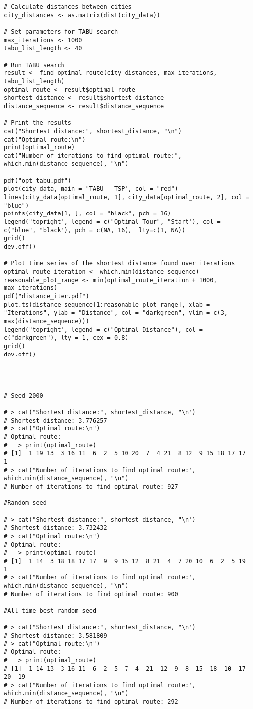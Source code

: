 \begin{tcolorbox}[colback=white!95!black,colframe=white!50!black,breakable]
\begin{lstlisting}[caption={Exercise 4b}, label={lst:tabu}]
# Calculate distances between cities
city_distances <- as.matrix(dist(city_data))

# Set parameters for TABU search
max_iterations <- 1000
tabu_list_length <- 40

# Run TABU search
result <- find_optimal_route(city_distances, max_iterations, tabu_list_length)
optimal_route <- result$optimal_route
shortest_distance <- result$shortest_distance
distance_sequence <- result$distance_sequence

# Print the results
cat("Shortest distance:", shortest_distance, "\n")
cat("Optimal route:\n")
print(optimal_route)
cat("Number of iterations to find optimal route:", which.min(distance_sequence), "\n")

pdf("opt_tabu.pdf")
plot(city_data, main = "TABU - TSP", col = "red")
lines(city_data[optimal_route, 1], city_data[optimal_route, 2], col = "blue")
points(city_data[1, ], col = "black", pch = 16)
legend("topright", legend = c("Optimal Tour", "Start"), col = c("blue", "black"), pch = c(NA, 16),  lty=c(1, NA))
grid()
dev.off()

# Plot time series of the shortest distance found over iterations
optimal_route_iteration <- which.min(distance_sequence)
reasonable_plot_range <- min(optimal_route_iteration + 1000, max_iterations)
pdf("distance_iter.pdf")
plot.ts(distance_sequence[1:reasonable_plot_range], xlab = "Iterations", ylab = "Distance", col = "darkgreen", ylim = c(3, max(distance_sequence)))
legend("topright", legend = c("Optimal Distance"), col = c("darkgreen"), lty = 1, cex = 0.8)
grid()
dev.off()




# Seed 2000

# > cat("Shortest distance:", shortest_distance, "\n")
# Shortest distance: 3.776257 
# > cat("Optimal route:\n")
# Optimal route:
#   > print(optimal_route)
# [1]  1 19 13  3 16 11  6  2  5 10 20  7  4 21  8 12  9 15 18 17 17  1
# > cat("Number of iterations to find optimal route:", which.min(distance_sequence), "\n")
# Number of iterations to find optimal route: 927 

#Random seed

# > cat("Shortest distance:", shortest_distance, "\n")
# Shortest distance: 3.732432 
# > cat("Optimal route:\n")
# Optimal route:
#   > print(optimal_route)
# [1]  1 14  3 18 18 17 17  9  9 15 12  8 21  4  7 20 10  6  2  5 19  1
# > cat("Number of iterations to find optimal route:", which.min(distance_sequence), "\n")
# Number of iterations to find optimal route: 900 

#All time best random seed 

# > cat("Shortest distance:", shortest_distance, "\n")
# Shortest distance: 3.581809 
# > cat("Optimal route:\n")
# Optimal route:
#   > print(optimal_route)
# [1]  1 14 13  3 16 11  6  2  5  7  4  21  12  9  8  15  18  10  17  20  19
# > cat("Number of iterations to find optimal route:", which.min(distance_sequence), "\n")
# Number of iterations to find optimal route: 292 
\end{lstlisting}
\end{tcolorbox}

